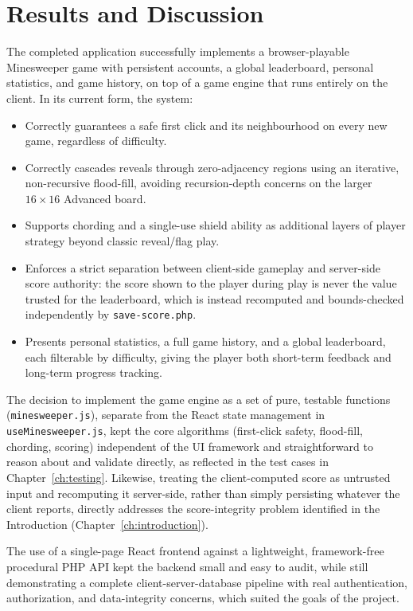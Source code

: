 \chapter{Results and Discussion}
\label{ch:results}

The completed application successfully implements a browser-playable
Minesweeper game with persistent accounts, a global leaderboard, personal
statistics, and game history, on top of a game engine that runs entirely on
the client. In its current form, the system:

\begin{itemize}[nosep]
    \item Correctly guarantees a safe first click and its neighbourhood on
    every new game, regardless of difficulty.
    \item Correctly cascades reveals through zero-adjacency regions using an
    iterative, non-recursive flood-fill, avoiding recursion-depth concerns
    on the larger $16\times16$ Advanced board.
    \item Supports chording and a single-use shield ability as additional
    layers of player strategy beyond classic reveal/flag play.
    \item Enforces a strict separation between client-side gameplay and
    server-side score authority: the score shown to the player during play
    is never the value trusted for the leaderboard, which is instead
    recomputed and bounds-checked independently by \texttt{save-score.php}.
    \item Presents personal statistics, a full game history, and a global
    leaderboard, each filterable by difficulty, giving the player both
    short-term feedback and long-term progress tracking.
\end{itemize}

The decision to implement the game engine as a set of pure, testable
functions (\texttt{minesweeper.js}), separate from the React state
management in \texttt{useMinesweeper.js}, kept the core algorithms
(first-click safety, flood-fill, chording, scoring) independent of the UI
framework and straightforward to reason about and validate directly, as
reflected in the test cases in Chapter~\ref{ch:testing}. Likewise, treating
the client-computed score as untrusted input and recomputing it
server-side, rather than simply persisting whatever the client reports,
directly addresses the score-integrity problem identified in the
Introduction (Chapter~\ref{ch:introduction}).

The use of a single-page React frontend against a lightweight,
framework-free procedural PHP API kept the backend small and easy to audit,
while still demonstrating a complete client-server-database pipeline with
real authentication, authorization, and data-integrity concerns, which
suited the goals of the project.
